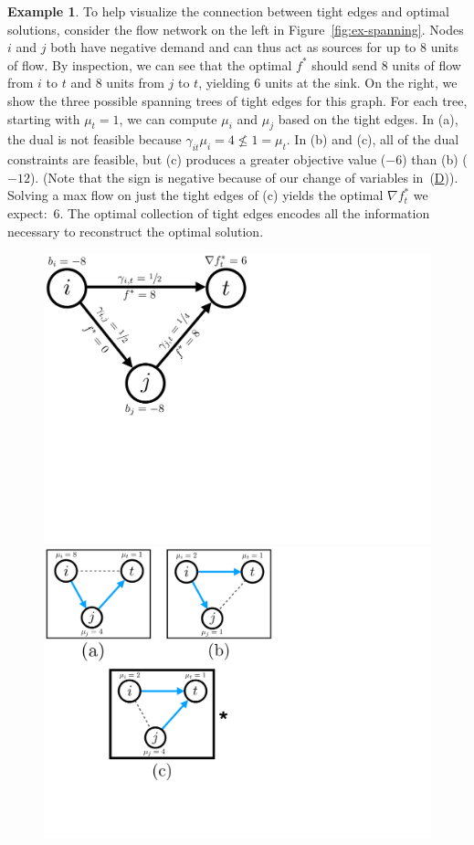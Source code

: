 \documentclass[11pt]{article}
\theoremstyle{definition}
\theoremstyle{definition}
\theoremstyle{definition}
\newtheorem{example}{Example}[section]
\begin{document}
	\begin{example}
		To help visualize the connection between tight edges and optimal solutions, 
	consider the flow network on the left in 
	Figure~\ref{fig:ex-spanning}. Nodes $i$ and $j$ both have negative demand and can
	thus act as sources for up to 8 units of flow. By inspection, we can see that the optimal $f^{*}$
	should send 8 units of flow from $i$ to $t$ and 8 units from $j$ to $t$,
	yielding 6 units at the sink. On the right, we show the three possible spanning
	trees of tight edges for this graph.
	For each tree, starting with $\mu_t = 1$, we can compute $\mu_i$
	and $\mu_j$ based on the tight edges. In (a), the dual is not feasible because
	$\gamma_{it}\mu_i = 4 \nleq 1 = \mu_t$.
	In (b) and (c), all of the dual constraints are feasible,
	but (c) produces a greater objective value ($-6$)
	than (b) ($-12$). (Note that the sign is negative because of our change of variables
	in~(\hyperref[eqn:dual]{D})). Solving a max flow on just the tight edges of (c)
	yields the optimal $\nabla f_t^{*}$ we expect:~6.
  The optimal collection of tight edges encodes all the information necessary
	to reconstruct the optimal solution.
	\begin{figure}[h]
	\centering
	\begin{minipage}{.49\textwidth}
		\centering
		\includegraphics[width=0.8\linewidth]{figs/tight}
	\end{minipage}
	\begin{minipage}{.49\textwidth}
		\centering
		\includegraphics[width=.75\linewidth]{figs/tight-span-2}

\end{minipage}
\end{figure}
\end{example}
\end{document}
